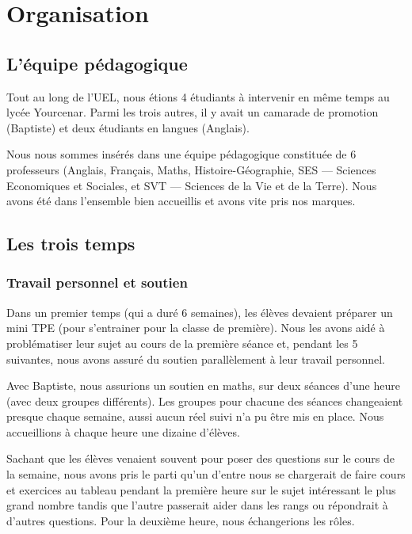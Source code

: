 \section{Organisation}

\subsection{L'équipe pédagogique}

Tout au long de l'UEL, nous étions 4 étudiants à intervenir en même temps au lycée Yourcenar. Parmi les trois autres, il
y avait un camarade de promotion (Baptiste) et deux étudiants en langues (Anglais).

Nous nous sommes insérés dans une équipe pédagogique constituée de 6 professeurs (Anglais, Français, Maths,
Histoire-Géographie, SES --- Sciences Economiques et Sociales, et SVT --- Sciences de la Vie et de la Terre). Nous
avons été dans l'ensemble bien accueillis et avons vite pris nos marques.

\subsection{Les trois temps}

\subsubsection{Travail personnel et soutien}

Dans un premier temps (qui a duré 6 semaines), les élèves devaient préparer un mini TPE (pour s'entrainer pour la classe
de première). Nous les avons aidé à problématiser leur sujet au cours de la première séance et, pendant les 5 suivantes,
nous avons assuré du soutien parallèlement à leur travail personnel.

Avec Baptiste, nous assurions un soutien en maths, sur deux séances d'une heure (avec deux groupes différents). Les
groupes pour chacune des séances changeaient presque chaque semaine, aussi aucun réel suivi n'a pu être mis en place. Nous
accueillions à chaque heure une dizaine d'élèves.

Sachant que les élèves venaient souvent pour poser des questions sur le cours de la semaine, nous avons pris le parti
qu'un d'entre nous se chargerait de faire cours et exercices au tableau pendant la première heure sur le sujet intéressant
le plus grand nombre tandis que l'autre passerait aider dans les rangs ou répondrait à d'autres questions. Pour la
deuxième heure, nous échangerions les rôles.

